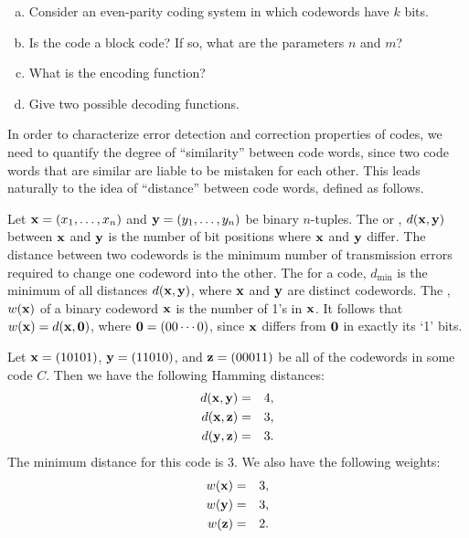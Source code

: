 \begin{exercise}{}
\begin{enumerate}[(a)]
\item
Consider an even-parity coding system in which codewords have $k$ bits. 
\item
Is the code a block code? If so, what are the parameters $n$ and $m$? 
\item
What is the encoding function? 
\item
Give two possible decoding functions.
\end{enumerate}
\end{exercise}

In order to characterize error detection and correction properties of codes, we need to quantify the degree of ``similarity'' between code words, since two code words that are similar are liable to be mistaken for each other. This leads naturally to the idea of ``distance'' between code words, defined as follows.

\begin{defn}\label{defn:algcodes:weight} 
Let ${\bold x} = (x_1, \ldots, x_n)$ and ${\bold y} = (y_1, \ldots,
y_n)$ be binary $n$-tuples. The  or , $d({\bold x}, {\bold
y})$ between ${\bold x}$ and ${\bold y}$ is
the number of bit positions where ${\bold x}$ and ${\bold y}$ differ. The
distance between two codewords is the minimum number of transmission
errors required to change one codeword into the other. The
 for a code,
$d_{\min}$ is the minimum of all distances
$d({\bold x}, {\bold y})$, where ${\bold x}$ and ${\bold y}$ are
distinct codewords. The ,
$w({\bold x})$ of a binary codeword ${\bold x}$ is
the number of 1's in ${\bold x}$. It follows that $w({\bold x}) = d({\bold
x}, {\bold 0})$, where ${\bold 0} = (00 \cdots 0)$, since ${\bold x}$ differs from ${\bold 0}$ in exactly its `1' bits.
\end{defn} 
 
\begin{example}{}
Let ${\bold x} = (10101)$, ${\bold y} = (11010)$, and ${\bold z} =
(00011)$ be all of the codewords in some code $C$. Then we have the
following Hamming distances: 
\begin{eqnarray*}
d({\bold x},{\bold y}) & = & 4, \\
d({\bold x},{\bold z}) & = & 3, \\
d({\bold y},{\bold z}) & = & 3.
\end{eqnarray*}
The minimum distance  for this code is 3. We also have the
following weights: 
\begin{eqnarray*}
w({\bold x}) & = & 3, \\
w({\bold y}) & = & 3, \\
w({\bold z}) & = & 2.
\end{eqnarray*}
\end{example}
 
